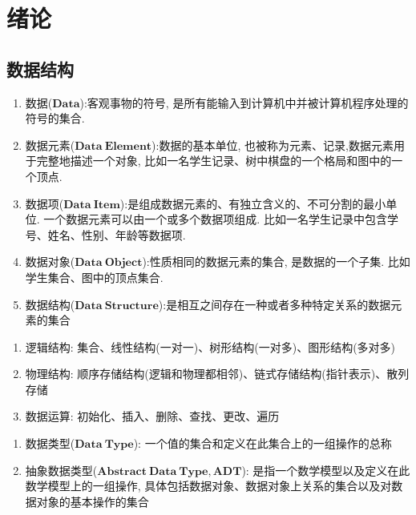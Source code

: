 \chapter{绪论}
\section{数据结构}
\begin{definition}[基本术语]
    \begin{enumerate}
        \item 数据($\mathbf{Data}$):客观事物的符号, 是所有能输入到计算机中并被计算机程序处理的符号的集合.
        \item 数据元素($\mathbf{Data\ Element}$):数据的基本单位, 也被称为元素、记录,数据元素用于完整地描述一个对象, 比如一名学生记录、树中棋盘的一个格局和图中的一个顶点.
        \item 数据项($\mathbf{Data\ Item}$):是组成数据元素的、有独立含义的、不可分割的最小单位. 一个数据元素可以由一个或多个数据项组成. 比如一名学生记录中包含学号、姓名、性别、年龄等数据项.
        \item 数据对象($\mathbf{Data\ Object}$):性质相同的数据元素的集合, 是数据的一个子集. 比如学生集合、图中的顶点集合.
        \item 数据结构($\mathbf{Data\ Structure}$):是相互之间存在一种或者多种特定关系的数据元素的集合
    \end{enumerate}
\end{definition}

\begin{definition}[数据结构三要素]
    \begin{enumerate}
        \item 逻辑结构: 集合、线性结构(一对一)、树形结构(一对多)、图形结构(多对多)
        \item 物理结构: 顺序存储结构(逻辑和物理都相邻)、链式存储结构(指针表示)、散列存储
        \item 数据运算: 初始化、插入、删除、查找、更改、遍历
    \end{enumerate}
\end{definition}

\begin{definition}[数据类型和抽象数据类型]
    \begin{enumerate}
        \item 数据类型($\mathbf{Data\ Type}$): 一个值的集合和定义在此集合上的一组操作的总称
        \item 抽象数据类型($\mathbf{Abstract\ Data\ Type},\mathbf{ADT}$): 是指一个数学模型以及定义在此数学模型上的一组操作, 具体包括数据对象、数据对象上关系的集合以及对数据对象的基本操作的集合
    \end{enumerate}
\end{definition}

